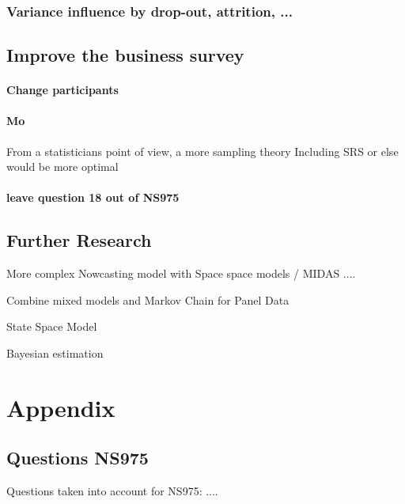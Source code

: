 \documentclass[12pt,a4paper,oneside]{book}
\begin{document}
\subsection*{Variance influence by drop-out, attrition, ...}

\section{Improve the business survey}

\subsubsection*{Change participants}

\subsubsection*{Mo}
From a statisticians point of view, a more sampling theory Including SRS or else would be more optimal

\subsubsection{leave question 18 out of NS975}

\section{Further Research}



More complex Nowcasting model with Space space models / MIDAS ....

Combine mixed models and Markov Chain for Panel Data \citep{de_haan-rietdijk_use_2017} 

State Space Model

Bayesian estimation \cite{bialowolski_bayesian_nodate}

\nocite{hlavac_stargazer:_2018}


 


  
\begin{appendix}
  \listoffigures
  \listoftables
\end{appendix}


\chapter*{Appendix}

\section*{Questions NS975}
\label{Appendix: Question NS975 description}
Questions taken into account for NS975:
....
\end{document}
